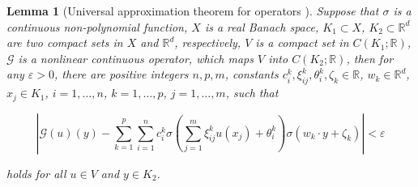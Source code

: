 \documentclass{article}
\numberwithin{equation}{section}
\theoremstyle{plain}
\newtheorem{lemma}{Lemma}[section]
\begin{document}
	\begin{lemma}[Universal approximation theorem for operators \cite{CC95}]
		Suppose that $\sigma$ is a continuous non-polynomial function, $X$ is a real Banach space, $K_1 \subset X$, $K_2 \subset \mathbb{R}^d$ are two compact sets in $X$ and $\mathbb{R}^d$, respectively, $V$ is a compact set in $C(K_1;\mathbb R)$, $\mathscr{G}$ is a nonlinear continuous operator, which maps $V$ into $C(K_2;\mathbb R)$, then for any $\varepsilon > 0$, there are positive integers $n, p, m$, constants $c_i^k, \xi_{ij}^k, \theta_i^k, \zeta_k \in \mathbb{R}$, $w_k \in \mathbb{R}^d$, $x_j \in K_1$, $i = 1, \ldots, n$, $k = 1, \ldots, p$, $j = 1, \ldots, m$, such that
		
		\begin{equation*}
			\left| \mathscr{G}(u)(y) - \sum_{k=1}^{p} \sum_{i=1}^{n} c_i^k \sigma \left( \sum_{j=1}^{m} \xi_{ij}^k u(x_j) + \theta_i^k \right) \sigma(w_k \cdot y + \zeta_k) \right| < \varepsilon
		\end{equation*}
		
		holds for all $u \in V$ and $y \in K_2$.
	\end{lemma}
	
\end{document}
